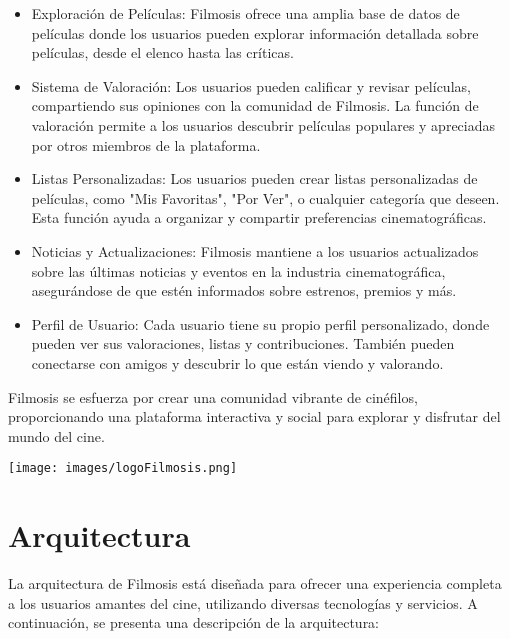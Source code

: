 \documentclass{article}
\begin{document}
\begin{itemize}
    \item Exploración de Películas: Filmosis ofrece una amplia base de datos de películas donde los usuarios pueden explorar información detallada sobre películas, desde el elenco hasta las críticas.
    
    \item Sistema de Valoración: Los usuarios pueden calificar y revisar películas, compartiendo sus opiniones con la comunidad de Filmosis. La función de valoración permite a los usuarios descubrir películas populares y apreciadas por otros miembros de la plataforma.
    
    \item Listas Personalizadas: Los usuarios pueden crear listas personalizadas de películas, como "Mis Favoritas", "Por Ver", o cualquier categoría que deseen. Esta función ayuda a organizar y compartir preferencias cinematográficas.
    
    \item Noticias y Actualizaciones: Filmosis mantiene a los usuarios actualizados sobre las últimas noticias y eventos en la industria cinematográfica, asegurándose de que estén informados sobre estrenos, premios y más.
    
    \item Perfil de Usuario: Cada usuario tiene su propio perfil personalizado, donde pueden ver sus valoraciones, listas y contribuciones. También pueden conectarse con amigos y descubrir lo que están viendo y valorando.
\end{itemize}

Filmosis se esfuerza por crear una comunidad vibrante de cinéfilos, proporcionando una plataforma interactiva y social para explorar y disfrutar del mundo del cine.

\vspace{1cm}

\begin{minipage}{1\textwidth}
    \centering
    \texttt{[image: images/logoFilmosis.png]}
\end{minipage}

\section{Arquitectura}

La arquitectura de Filmosis está diseñada para ofrecer una experiencia completa a los usuarios amantes del cine, utilizando diversas tecnologías y servicios. A continuación, se presenta una descripción de la arquitectura:
\end{document}
